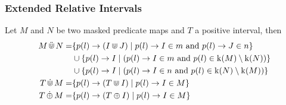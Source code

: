 \documentclass{beamer}
\begin{document}
\begin{frame}
    \frametitle{Extended Relative Intervals}

    \begin{definition}
        \label{def:e-rel-int-ops}
        Let $M$ and $N$ be two masked predicate maps and $T$ a positive interval, then 
        \begin{align*}
            M \,\ddot{\Cup}\, N = 
                & \{ p(l) \rightarrow (I \Cup J) \mid 
                    p(l) \rightarrow I \in m \text{ and } 
                    p(l) \rightarrow J \in n \} \\
                & \cup \{p(l) \rightarrow I \mid  
                    (p(l) \rightarrow I \in m \text{ and }
                    p(l) \in \operatorname{k}(M) \setminus \operatorname{k}(N)) \} \\
                & \cup \{p(l) \rightarrow I \mid  
                    (p(l) \rightarrow I \in n \text{ and }
                    p(l) \in \operatorname{k}(N) \setminus \operatorname{k}(M))
                    \} \\
            T \,\dot{\Cup}\, M = 
                & \{ p(l) \rightarrow (T \Cup I) \mid 
                    p(l) \rightarrow I \in M \} \\
            T \,\dot{\oplus}\, M = 
                & \{ p(l) \rightarrow (T \oplus I) \mid 
                    p(l) \rightarrow I \in M \} \\
        \end{align*}
    \end{definition}
    
\end{frame}
\end{document}
